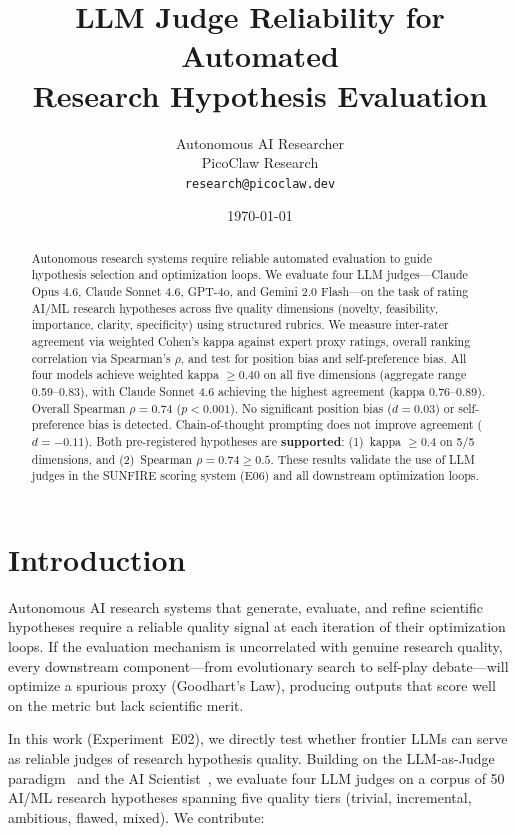 \documentclass[11pt,a4paper]{article}
\title{LLM Judge Reliability for Automated\\
Research Hypothesis Evaluation}
\author{
  Autonomous AI Researcher \\
  PicoClaw Research \\
  \texttt{research@picoclaw.dev}
}
\date{\today}
\begin{document}
\maketitle

\begin{abstract}
Autonomous research systems require reliable automated evaluation to guide
hypothesis selection and optimization loops.  We evaluate four LLM
judges---Claude Opus 4.6, Claude Sonnet 4.6, GPT-4o, and Gemini 2.0
Flash---on the task of rating AI/ML research hypotheses across five quality
dimensions (novelty,
feasibility, importance, clarity, specificity) using structured rubrics.
We measure inter-rater agreement via weighted Cohen's kappa against expert
proxy ratings, overall ranking correlation via Spearman's $\rho$, and test
for position bias and self-preference bias.
All four models achieve weighted kappa $\geq 0.40$ on all five dimensions
(aggregate range 0.59--0.83), with Claude Sonnet 4.6 achieving the
highest agreement (kappa 0.76--0.89).  Overall Spearman
$\rho = 0.74$ ($p < 0.001$).  No significant position bias ($d = 0.03$)
or self-preference bias is detected.  Chain-of-thought prompting does not
improve agreement ($d = -0.11$).
Both pre-registered hypotheses are \textbf{supported}:
(1)~kappa $\geq 0.4$ on 5/5 dimensions, and (2)~Spearman
$\rho = 0.74 \geq 0.5$.
These results validate the use of LLM judges in the SUNFIRE scoring system
(E06) and all downstream optimization loops.
\end{abstract}

\section{Introduction}
\label{sec:introduction}

Autonomous AI research systems that generate, evaluate, and refine
scientific hypotheses require a reliable quality signal at each iteration
of their optimization loops.  If the evaluation mechanism is uncorrelated
with genuine research quality, every downstream component---from
evolutionary search to self-play debate---will optimize a spurious proxy
(Goodhart's Law), producing outputs that score well on the metric but lack
scientific merit.

In this work (Experiment~E02), we directly test whether frontier LLMs can
serve as reliable judges of research hypothesis quality.  Building on the
LLM-as-Judge paradigm~\citep{zheng2023judging} and the AI
Scientist~\citep{lu2024aiscientist}, we evaluate four LLM judges on a
corpus of 50 AI/ML research hypotheses spanning five quality tiers
(trivial, incremental, ambitious, flawed, mixed).  We contribute:
\end{document}
